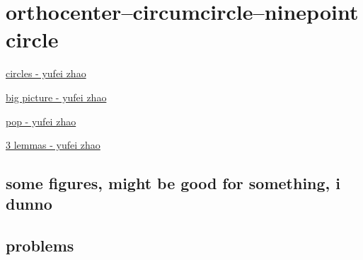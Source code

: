 \graphicspath{{pics/}}


\newpage\section{orthocenter--circumcircle--ninepoint circle}


\begin{myitemize}
\item \href{http://yufeizhao.com/olympiad/imo2008/zhao-circles.pdf}{circles - yufei zhao}
\item \href{http://yufeizhao.com/olympiad/cyclic_quad.pdf}{big picture - yufei zhao}
\item \href{http://yufeizhao.com/olympiad/power_of_a_point.pdf}{pop - yufei zhao}
\item \href{http://yufeizhao.com/olympiad/three_geometry_lemmas.pdf}{3 lemmas - yufei zhao}
\end{myitemize}


\subsection{some figures, might be good for something, i dunno}




\subsection{problems}


\begin{minipage}{.3\textwidth}
\end{minipage}\hfill%
\begin{minipage}{.65\textwidth}
\end{minipage}








